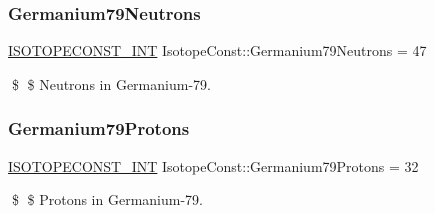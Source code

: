 \subsubsection{\texorpdfstring{Germanium79\+Neutrons}{Germanium79Neutrons}}
{\footnotesize\ttfamily \mbox{\hyperlink{group___isotope_const-_macros_ga5f18360b3e99483a35c32d789e62621c}{I\+S\+O\+T\+O\+P\+E\+C\+O\+N\+S\+T\+\_\+\+I\+NT}} Isotope\+Const\+::\+Germanium79\+Neutrons = 47}

\$ \$ Neutrons in Germanium-\/79. \mbox{\label{group___isotope_const-_germanium-_ge79_ga8e3d19610f8a55af272aa43231f3bb99}} 
\subsubsection{\texorpdfstring{Germanium79\+Protons}{Germanium79Protons}}
{\footnotesize\ttfamily \mbox{\hyperlink{group___isotope_const-_macros_ga5f18360b3e99483a35c32d789e62621c}{I\+S\+O\+T\+O\+P\+E\+C\+O\+N\+S\+T\+\_\+\+I\+NT}} Isotope\+Const\+::\+Germanium79\+Protons = 32}

\$ \$ Protons in Germanium-\/79. 